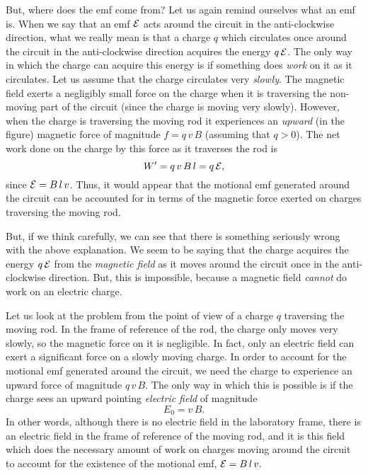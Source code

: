 But, where does the emf come from? Let us again remind ourselves what an
emf is. When we say that an emf ${\cal E}$ acts around the circuit
in the anti-clockwise direction, what we really mean is that a charge $q$
which circulates once around the circuit in the anti-clockwise direction
acquires the energy $q\,{\cal E}$. The only way in which the charge
can acquire this energy is if something does {\em work}\/
 on it as it circulates.
Let us assume that the charge circulates very {\em slowly}. The magnetic
field exerts a negligibly small force on the charge when it is traversing the
non-moving part of the circuit (since the charge is moving very slowly). 
However, when the charge is traversing the moving rod
it experiences  an {\em upward}\/ (in the figure) magnetic force of magnitude $f=q\,v\,B$ 
 (assuming that
$q>0$). The net work done on the charge by this force as
it traverses the rod is 
\begin{equation}
W' = q\,v\,B\,l = q\,{\cal E},
\end{equation}
since ${\cal E} = B\,l\,v$. Thus, it would appear that the motional emf
generated around the circuit can be accounted for in terms of the
magnetic  force exerted
on charges traversing  the moving rod. 

But, if we think carefully, we can see that there is something
seriously wrong with the above explanation. 
We seem to be saying that the charge acquires the energy $q\,{\cal E}$
from the {\em magnetic field}\/ as it moves around the circuit once in the
anti-clockwise direction. But, this is impossible, because a magnetic field 
{\em cannot}\/ do  work on an electric charge. 


Let us look at the problem from the point of view of a charge
$q$ traversing the moving rod. In the frame of reference of the rod,
the charge only moves very slowly, so the magnetic force on it is negligible. In fact, only an electric field can exert a significant
force on a slowly moving charge. In order to account for the motional emf generated
around the circuit, we need the charge to experience an upward force of
magnitude $q\,v\,B$. The only way in which this is possible is if the charge
sees an upward pointing {\em electric field}\/ of magnitude
\begin{equation}
E_0 = v\,B.
\end{equation}
In other words, although there is no electric field in the laboratory frame,
there is an electric field in the frame of reference of the moving rod,
and it is this field which does the necessary  amount of work on charges
moving around the circuit to account for the existence
of the motional emf, ${\cal E}=B\,l\,v.$

